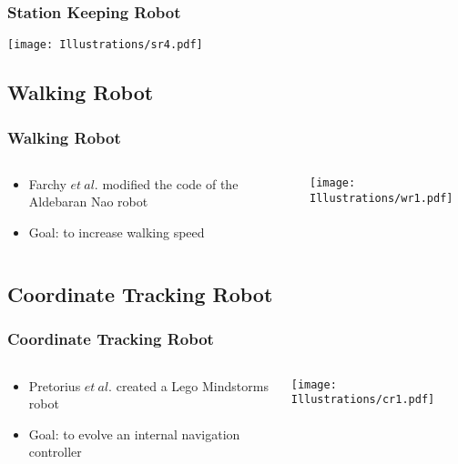 \documentclass{beamer}
\begin{document}
\begin{frame}
  \frametitle{Station Keeping Robot}
\begin{center}
 \texttt{[image: Illustrations/sr4.pdf]}
       \\
\end{center}

\end{frame}

\subsection{Walking Robot}
\begin{frame}
  \frametitle{Walking Robot}

\begin{columns}
  \begin{column}{0.5\textwidth}
\begin{itemize}
\item  Farchy $et~al.$ modified the code of the Aldebaran Nao robot
\item Goal: to increase walking speed
\end{itemize}
\end{column}
\begin{column}{0.5\textwidth}
 \texttt{[image: Illustrations/wr1.pdf]}
       \\
\end{column}
\end{columns}
\end{frame}

\subsection{Coordinate Tracking Robot}
\begin{frame}
  \frametitle{Coordinate Tracking Robot}
\begin{columns}
  \begin{column}{0.5\textwidth}
\begin{itemize}
\item  Pretorius $et~al.$ created a Lego Mindstorms robot
\item Goal: to evolve an internal navigation controller
\end{itemize}
\end{column}
\begin{column}{0.5\textwidth}
 \texttt{[image: Illustrations/cr1.pdf]}
       \\
\end{column}
\end{columns}
\end{frame}
\end{document}
